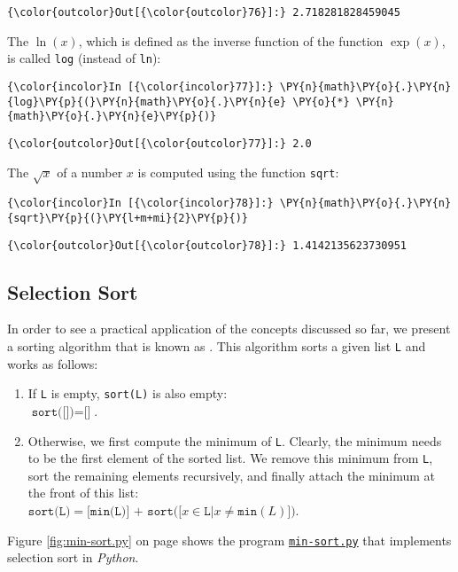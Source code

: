 \begin{Verbatim}[commandchars=\\\{\}]
{\color{outcolor}Out[{\color{outcolor}76}]:} 2.718281828459045
\end{Verbatim}
The  \(\ln(x)\), which is defined as the inverse function of the function \(\exp(x)\), is called \texttt{log} (instead of \texttt{ln}):
\begin{Verbatim}[commandchars=\\\{\}]
{\color{incolor}In [{\color{incolor}77}]:} \PY{n}{math}\PY{o}{.}\PY{n}{log}\PY{p}{(}\PY{n}{math}\PY{o}{.}\PY{n}{e} \PY{o}{*} \PY{n}{math}\PY{o}{.}\PY{n}{e}\PY{p}{)}
\end{Verbatim}

\begin{Verbatim}[commandchars=\\\{\}]
{\color{outcolor}Out[{\color{outcolor}77}]:} 2.0
\end{Verbatim}
The  \(\sqrt{x}\) of a number \(x\) is computed using the
function \texttt{sqrt}:
\begin{Verbatim}[commandchars=\\\{\}]
{\color{incolor}In [{\color{incolor}78}]:} \PY{n}{math}\PY{o}{.}\PY{n}{sqrt}\PY{p}{(}\PY{l+m+mi}{2}\PY{p}{)}
\end{Verbatim}

\begin{Verbatim}[commandchars=\\\{\}]
{\color{outcolor}Out[{\color{outcolor}78}]:} 1.4142135623730951
\end{Verbatim}


\subsection{Selection Sort}
In order to see a practical application of the concepts discussed so far, we present a sorting
algorithm that is known as \href{https://en.wikipedia.org/wiki/Selection_sort}{}.
This algorithm sorts a given list \texttt{L} and works as follows:
\begin{enumerate}
\item If \texttt{L} is empty, \texttt{sort(L)} is also empty:
      \\[0.2cm]
      \hspace*{1.3cm}
      $\texttt{sort([])} = \texttt{[]}$.
\item Otherwise, we first compute the minimum of \texttt{L}.  Clearly, the minimum needs to be the
      first element of the sorted list.  We remove this minimum from \texttt{L}, sort the remaining
      elements recursively, and finally attach the minimum at the front of this list:
      \\[0.2cm]
      \hspace*{1.3cm}
      $\texttt{sort(L)} = \texttt{[min(L)] + sort([}x \in \texttt{L} \texttt{|} x \not= \texttt{min}(L)\texttt{])}$.
\end{enumerate}
Figure \ref{fig:min-sort.py} on page \pageref{fig:min-sort.py} shows the program
\href{https://github.com/karlstroetmann/Logik/blob/master/Python/min-sort.py}{\texttt{min-sort.py}}
that implements selection sort  in \textsl{Python}. 

